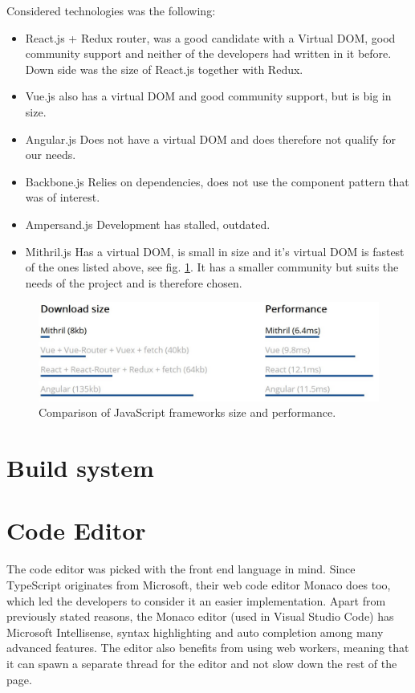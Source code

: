 \documentclass[12pt,a4paper]{report}
\begin{document}
Considered technologies was the following:
\begin{itemize}
    \item React.js + Redux router, was a good candidate with a Virtual DOM, good community support and neither of the developers had written in it before. Down side was the size of React.js together with Redux.
    \item Vue.js also has a virtual DOM and good community support, but is big in size.
    \item Angular.js Does not have a virtual DOM and does therefore not qualify for our needs.
    \item Backbone.js Relies on dependencies, does not use the component pattern that was of interest.
    \item Ampersand.js Development has stalled, outdated.
    \item Mithril.js Has a virtual DOM, is small in size and it's virtual DOM is fastest of the ones listed above, see fig. \ref{fig:js-comp}. It has a smaller community but suits the needs of the project and is therefore chosen.
\end{itemize}

\begin{figure}[H]
  \centering
  \includegraphics[width=14cm]{mithril-js-perf.jpg}
  \caption{Comparison of JavaScript frameworks size and performance\cite{mithril-speed}.}
  \label{fig:js-comp}
\end{figure}
\section{Build system}

\section{Code Editor}
The code editor was picked with the front end language in mind. Since TypeScript originates from Microsoft, their web code editor Monaco does too, which led the developers to consider it an easier implementation.
Apart from previously stated reasons, the Monaco editor (used in Visual Studio Code) has Microsoft Intellisense, syntax highlighting and auto completion among many advanced features.
The editor also benefits from using web workers, meaning that it can spawn a separate thread for the editor and not slow down the rest of the page.
\end{document}
